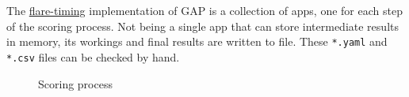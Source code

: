 \documentclass[gap.tex]{subfiles}
\begin{document}
The \href{https://github.com/BlockScope/flare-timing}{flare-timing}
implementation of GAP is a collection of apps, one for each step of the scoring
process. Not being a single app that can store intermediate results in memory,
its workings and final results are written to file. These \texttt{*.yaml} and
\texttt{*.csv} files can be checked by hand.

\begin{figure}[!ht]
    \centering
    
    \caption{Scoring process}
    \label{fig:flare-timing}
\end{figure}
\end{document}
